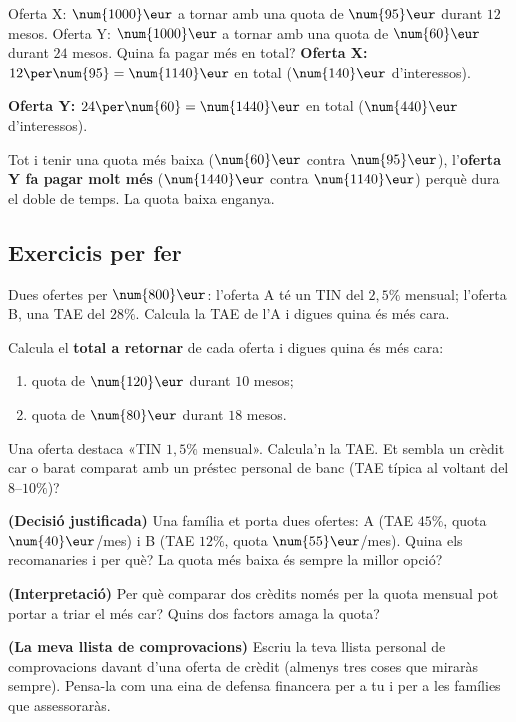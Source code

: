 \begin{exresolt}
Oferta X: $\num{1000}\eur$ a tornar amb una quota de $\num{95}\eur$ durant $12$ mesos.
Oferta Y: $\num{1000}\eur$ a tornar amb una quota de $\num{60}\eur$ durant $24$ mesos.
Quina fa pagar més en total?
\solucio
\textbf{Oferta X:} $12\per\num{95}=\num{1140}\eur$ en total ($\num{140}\eur$
d'interessos).

\textbf{Oferta Y:} $24\per\num{60}=\num{1440}\eur$ en total ($\num{440}\eur$
d'interessos).

Tot i tenir una quota més baixa ($\num{60}\eur$ contra $\num{95}\eur$), l'\textbf{oferta
Y fa pagar molt més} ($\num{1440}\eur$ contra $\num{1140}\eur$) perquè dura el doble de
temps. La quota baixa enganya.
\end{exresolt}

\subsection{Exercicis per fer}

\begin{exercicis}
\begin{exlist}
  \item Dues ofertes per $\num{800}\eur$: l'oferta A té un TIN del $2,5\%$ mensual;
        l'oferta B, una TAE del $28\%$. Calcula la TAE de l'A i digues quina és més
        cara.
  \item Calcula el \textbf{total a retornar} de cada oferta i digues quina és més cara:
    \begin{enumerate}[label=\alph*), leftmargin=1.6em, topsep=2pt]
      \item quota de $\num{120}\eur$ durant $10$ mesos;
      \item quota de $\num{80}\eur$ durant $18$ mesos.
    \end{enumerate}
  \item Una oferta destaca «TIN $1,5\%$ mensual». Calcula'n la TAE. Et sembla un crèdit
        car o barat comparat amb un préstec personal de banc (TAE típica al voltant del
        $8$–$10\%$)?
  \item \textbf{(Decisió justificada)} Una família et porta dues ofertes: A (TAE
        $45\%$, quota $\num{40}\eur$/mes) i B (TAE $12\%$, quota $\num{55}\eur$/mes).
        Quina els recomanaries i per què? La quota més baixa és sempre la millor opció?
  \item \textbf{(Interpretació)} Per què comparar dos crèdits només per la quota mensual
        pot portar a triar el més car? Quins dos factors amaga la quota?
  \item \textbf{(La meva llista de comprovacions)} Escriu la teva llista personal de
        comprovacions davant d'una oferta de crèdit (almenys tres coses que miraràs
        sempre). Pensa-la com una eina de defensa financera per a tu i per a les
        famílies que assessoraràs.
\end{exlist}
\end{exercicis}

